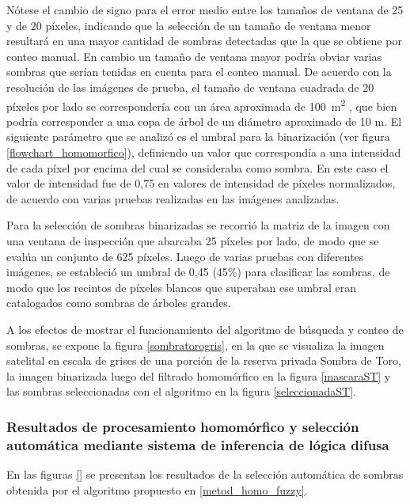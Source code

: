 Nótese el cambio de signo para el error medio entre los tamaños de ventana de 25 y de 20 píxeles, indicando que la selección de un tamaño de ventana menor resultará en una mayor cantidad de sombras detectadas que la que se obtiene por conteo manual. En cambio un tamaño de ventana mayor podría obviar varias sombras que serían tenidas en cuenta para el conteo manual. De acuerdo con la resolución de las imágenes de prueba, el tamaño de ventana cuadrada de 20 píxeles por lado se correspondería con un área aproximada de \SI{100}{\metre\squared} , que bien podría corresponder a una copa de árbol de un diámetro aproximado de 10 m.
El siguiente parámetro que se analizó es el umbral para la binarización (ver figura \ref{flowchart_homomorfico}), definiendo un valor que correspondía a una intensidad de cada píxel por encima del cual se consideraba como sombra. En este caso el valor de intensidad fue de 0,75 en valores de intensidad de píxeles normalizados, de acuerdo con varias pruebas realizadas en las imágenes analizadas.

Para la selección de sombras binarizadas se recorrió la matriz de la imagen con una ventana de inspección que abarcaba 25 píxeles por lado, de modo que se evalúa un conjunto de 625 píxeles. Luego de varias pruebas con diferentes imágenes, se estableció un umbral de 0,45 (45\%) para clasificar las sombras, de modo que los recintos de píxeles blancos que superaban ese umbral eran catalogados como sombras de árboles grandes.

A los efectos de mostrar el funcionamiento del algoritmo de búsqueda y conteo de sombras, se expone la figura \ref{sombratorogris}, en la que se visualiza la imagen satelital en escala de grises de una porción de la reserva privada Sombra de Toro, la imagen binarizada luego del filtrado homomórfico en la figura \ref{mascaraST} y las sombras seleccionadas con el algoritmo en la figura \ref{seleccionadaST}.


\subsubsection{Resultados de procesamiento homomórfico y selección automática mediante sistema de inferencia de lógica difusa} \label{resultados homo difusa}
En las figuras \ref{} se presentan los resultados de la selección automática de sombras obtenida por el algoritmo propuesto en \ref{metod_homo_fuzzy}.

